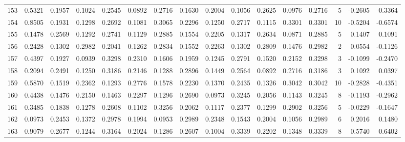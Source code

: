 \begin{tabular}{lrrrrrrrrrrrrrrr}
153 &      0.5321 &  0.1957 &  0.1024 &  0.2545 &  0.0892 &  0.2716 &  0.1630 &  0.2004 &  0.1056 &  0.2625 &   0.0976 &     0.2716 &      5 &                   -0.2605 &                    -0.3364 \\
154 &      0.8505 &  0.1931 &  0.1298 &  0.2692 &  0.1081 &  0.3065 &  0.2296 &  0.1250 &  0.2717 &  0.1115 &   0.3301 &     0.3301 &     10 &                   -0.5204 &                    -0.6574 \\
155 &      0.1478 &  0.2569 &  0.1292 &  0.2741 &  0.1129 &  0.2885 &  0.1554 &  0.2205 &  0.1317 &  0.2634 &   0.0871 &     0.2885 &      5 &                    0.1407 &                     0.1091 \\
156 &      0.2428 &  0.1302 &  0.2982 &  0.2041 &  0.1262 &  0.2834 &  0.1552 &  0.2263 &  0.1302 &  0.2809 &   0.1476 &     0.2982 &      2 &                    0.0554 &                    -0.1126 \\
157 &      0.4397 &  0.1927 &  0.0939 &  0.3298 &  0.2310 &  0.1606 &  0.1959 &  0.1245 &  0.2791 &  0.1520 &   0.2152 &     0.3298 &      3 &                   -0.1099 &                    -0.2470 \\
158 &      0.2094 &  0.2491 &  0.1250 &  0.3186 &  0.2146 &  0.1288 &  0.2896 &  0.1449 &  0.2564 &  0.0892 &   0.2716 &     0.3186 &      3 &                    0.1092 &                     0.0397 \\
159 &      0.5870 &  0.1519 &  0.2362 &  0.1293 &  0.2776 &  0.1578 &  0.2230 &  0.1370 &  0.2435 &  0.1326 &   0.3042 &     0.3042 &     10 &                   -0.2828 &                    -0.4351 \\
160 &      0.4438 &  0.1476 &  0.2150 &  0.1463 &  0.2297 &  0.1296 &  0.2690 &  0.0973 &  0.3245 &  0.2056 &   0.1143 &     0.3245 &      8 &                   -0.1193 &                    -0.2962 \\
161 &      0.3485 &  0.1838 &  0.1278 &  0.2608 &  0.1102 &  0.3256 &  0.2062 &  0.1117 &  0.2377 &  0.1299 &   0.2902 &     0.3256 &      5 &                   -0.0229 &                    -0.1647 \\
162 &      0.0973 &  0.2453 &  0.1372 &  0.2978 &  0.1994 &  0.0953 &  0.2989 &  0.2348 &  0.1543 &  0.2004 &   0.1056 &     0.2989 &      6 &                    0.2016 &                     0.1480 \\
163 &      0.9079 &  0.2677 &  0.1244 &  0.3164 &  0.2024 &  0.1286 &  0.2607 &  0.1004 &  0.3339 &  0.2202 &   0.1348 &     0.3339 &      8 &                   -0.5740 &                    -0.6402 \\

\end{tabular}

